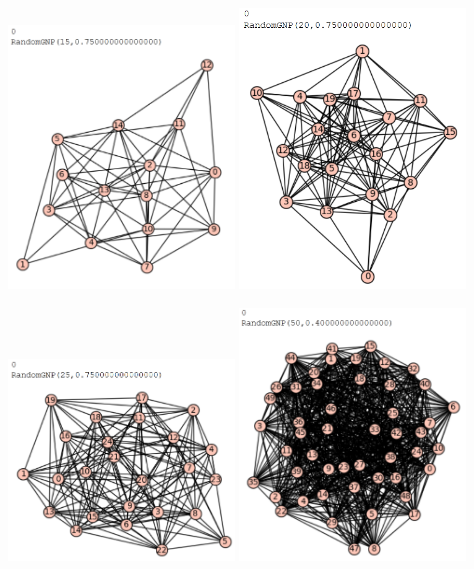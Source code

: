 \documentclass[10pt, a4paper]{article}
\begin{document}
\begin{center}
\includegraphics[width=6cm]{graf_15_0}
\includegraphics[width=6cm]{graf_20_0}
\end{center}

\begin{center}
\includegraphics[width=6cm]{graf_25_0}
\includegraphics[width=6cm]{graf_50_0}
\end{center}
\end{document}
